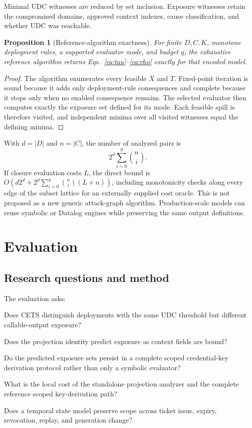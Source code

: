 \documentclass[preprint,12pt]{elsarticle}
\newtheorem{proposition}{Proposition}
\begin{document}
Minimal UDC witnesses are reduced by set inclusion.  Exposure witnesses retain
the compromised domains, approved context indexes, cause classification, and
whether UDC was reachable.

\begin{proposition}[Reference-algorithm exactness]
For finite $D,C,K$, monotone deployment rules, a supported evaluator mode, and
budget $q$, the exhaustive reference algorithm returns
Eqs.~\eqref{eq:tau}--\eqref{eq:rho} exactly for that encoded model.
\end{proposition}

\begin{proof}
The algorithm enumerates every feasible $X$ and $T$. Fixed-point iteration is
sound because it adds only deployment-rule consequences and complete because it
stops only when no enabled consequence remains. The selected evaluator then
computes exactly the exposure set defined for its mode. Each feasible spill is
therefore visited, and independent minima over all visited witnesses equal the
defining minima.
\end{proof}

With $d=|D|$ and $n=|C|$, the number of analyzed pairs is
\[
2^d\sum_{i=0}^{q}\binom{n}{i}.
\]
If closure evaluation costs $L$, the direct bound is
$O(d2^d+2^d\sum_{i=0}^{q}\binom{n}{i}(L+n))$, including monotonicity checks
along every edge of the subset lattice for an externally supplied cost oracle.
This is not proposed as a new generic attack-graph algorithm.  Production-scale
models can reuse symbolic or Datalog engines while preserving the same output
definitions.

\section{Evaluation}

\subsection{Research questions and method}

The evaluation asks:

\begin{description}[leftmargin=14mm,style=nextline]
\item[RQ1] Does CETS distinguish deployments with the same UDC threshold but
different callable-output exposure?
\item[RQ2] Does the projection identity predict exposure as context fields are
bound?
\item[RQ3] Do the predicted exposure sets persist in a complete scoped
credential-key derivation protocol rather than only a symbolic evaluator?
\item[RQ4] What is the local cost of the standalone projection analyzer and
the complete reference scoped key-derivation path?
\item[RQ5] Does a temporal state model preserve scope across ticket issue,
expiry, revocation, replay, and generation change?
\end{description}
\end{document}
